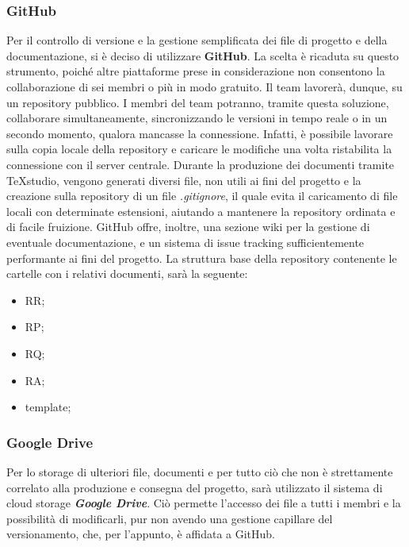 		\subsubsection{GitHub}
		Per il controllo di versione e la gestione semplificata dei file di progetto e della documentazione, si è deciso di utilizzare \textbf{GitHub}. La scelta è ricaduta su questo strumento, poiché altre piattaforme prese in considerazione non consentono la collaborazione di sei membri o più in modo gratuito. Il team lavorerà, dunque, su un repository pubblico. I membri del team potranno, tramite questa soluzione, collaborare simultaneamente, sincronizzando le versioni in tempo reale o in un secondo momento, qualora mancasse la connessione. Infatti, è possibile lavorare sulla copia locale della repository e caricare le modifiche una volta ristabilita la connessione con il server centrale. Durante la produzione dei documenti tramite TeXstudio, vengono generati diversi file, non utili ai fini del progetto e la creazione sulla repository di un file \textit{.gitignore}, il quale evita il caricamento di file locali con determinate estensioni, aiutando a mantenere la repository ordinata e di facile fruizione. GitHub offre, inoltre, una sezione wiki per la gestione di eventuale documentazione, e un sistema di issue tracking sufficientemente performante ai fini del progetto. 
		La struttura base della repository contenente le cartelle con i relativi documenti, sarà la seguente:
		\begin{itemize}
			\item RR;
			\item RP;
			\item RQ;
			\item RA;
			\item template;
		\end{itemize}

		\subsubsection{Google Drive}
		Per lo storage di ulteriori file, documenti e per tutto ciò che non è strettamente correlato alla produzione e consegna del progetto, sarà utilizzato il sistema di cloud storage \textbf{\textit{Google Drive}}. Ciò permette l'accesso dei file a tutti i membri e la possibilità di modificarli, pur non avendo una gestione capillare del versionamento, che, per l'appunto, è affidata a GitHub.

